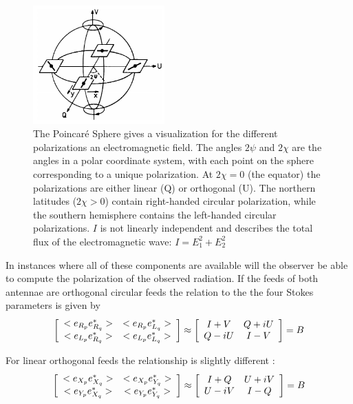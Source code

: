 \documentclass[a4paper,10pt]{report}
\begin{document}
\begin{figure}
\begin{mdframed}
\centering
\includegraphics[width=0.45\textwidth]{images/poincare_sphere.png}
\caption[The Poincar\'e Sphere]{The Poincar\'e Sphere gives a visualization for the different polarizations an electromagnetic field. The angles $2\psi$ and
$2\chi$ are the angles in a polar coordinate system, with each point on the sphere corresponding to a unique polarization. At $2\chi=0$ (the equator) the polarizations
are either linear (Q) or orthogonal (U). The northern latitudes ($2\chi > 0$) contain right-handed circular polarization, while the southern hemisphere
contains the left-handed circular polarizations. $I$ is not linearly independent and describes the total flux of the electromagnetic wave: 
$I = E_1^2 + E_2^2$ \cite{wilson2009tools}}
\label{fig_poincare}
\end{mdframed}
\end{figure}

In instances where all of these components are available will the observer be able to compute the polarization of
the observed radiation. If the feeds of both antennae are orthogonal circular feeds the relation to
the the four Stokes parameters is given by
\begin{equation}
    \left[\begin{array}{c c}
     <e_{R_p}e_{R_q}^*> & <e_{R_p}e_{L_q}^*> \\
     <e_{L_p}e_{R_q}^*> & <e_{L_p}e_{L_q}^*> \\
    \end{array}\right] \approx 
    \left[\begin{array}{c c}
     I + V & Q + iU \\
     Q - iU & I - V \\
    \end{array}\right] = B
\end{equation}

For linear orthogonal feeds the relationship is slightly different \cite{2011A&A...527A.106S}:
\begin{equation}
    \left[\begin{array}{c c}
     <e_{X_p}e_{X_q}^*> & <e_{X_p}e_{Y_q}^*> \\
     <e_{Y_p}e_{X_q}^*> & <e_{Y_p}e_{Y_q}^*> \\
    \end{array}\right] \approx 
    \left[\begin{array}{c c}
     I + Q & U + iV \\
     U - iV & I - Q \\
    \end{array}\right] = B
\end{equation}
\end{document}
